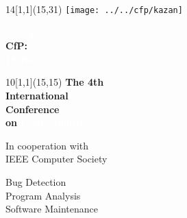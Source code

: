 \documentclass{article}
\begin{document}
\selectfont
\raggedbottom
\raggedright
\setlength{\topskip}{6pt}
\setlength{\parindent}{0pt} %
\setlength{\parskip}{6pt} %
\color{xblack}

\newcommand\invert[1]{\colorbox{xred}{\textcolor{white}{#1}}}

\begin{textblock}{14}[1,1](15,31)
  \raggedleft
  \texttt{[image: ../../cfp/kazan]}
\end{textblock}

\invert{\fontsize{64}{64}\selectfont\bfseries ICCQ}\\[24pt]
{\fontsize{18}{18}\selectfont\bfseries\color{xred}CfP: \\ \invert{18 Feb} \\}

\begin{textblock}{10}[1,1](15,15)
\fontsize{16}{16}\selectfont\bfseries
\raggedleft
The 4th \\
International \\
Conference \\
on \invert{Code Quality}

\vspace*{12pt}
In cooperation with \\
IEEE Computer Society

\vspace*{12pt}
Bug Detection \\
Program Analysis \\
Software Maintenance
\end{textblock}
\end{document}
